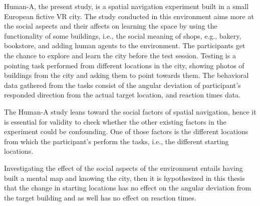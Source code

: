 Human-A, the present study, is a spatial navigation experiment built in a small European fictive VR city. The study conducted in this environment aims more at the social aspects and their affects on learning the space by using the functionality of some buildings, i.e., the social meaning of shops, e.g., bakery, bookstore, and adding human agents to the environment. The participants get the chance to explore and learn the city before the test session. Testing is a pointing task performed from different locations in the city, showing photos of buildings from the city and asking them to point towards them. The behavioral data gathered from the tasks consist of the angular deviation of participant's responded direction from the actual target location, and reaction times data.

The Human-A study leans toward the social factors of spatial navigation, hence it is essential for validity to check whether the other existing factors in the experiment could be confounding. One of those factors is the different locations from which the participant's perform the tasks, i.e., the different starting locations. 

Investigating the effect of the social aspects of the environment entails having built a mental map and knowing the city, then it is hypothesized in this thesis that the change in starting locations has no effect on the angular deviation from the target building and as well has no effect on reaction times.
